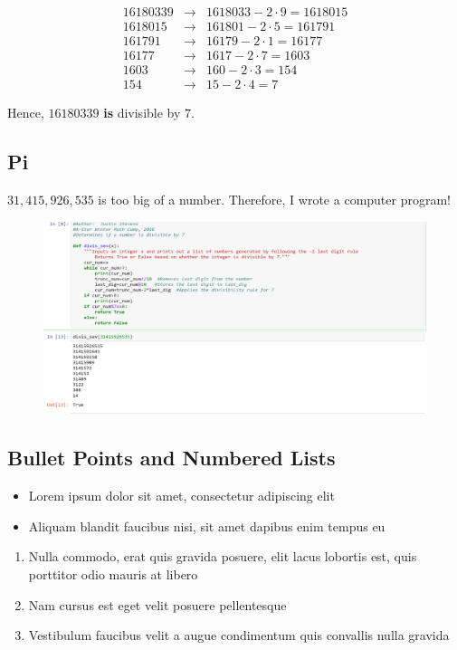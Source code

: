 \begin{eqnarray*}
	16180339 &\to& 1618033-2\cdot 9=1618015 \\ 1618015 &\to& 161801-2\cdot 5=161791 \\ 161791 &\to& 16179-2\cdot 1=16177 \\ 16177 &\to& 1617-2\cdot 7=1603 \\ 1603 &\to& 160-2\cdot 3=154 \\ 154 &\to& 15-2\cdot 4=7
\end{eqnarray*}  

Hence, $16180339$ \textbf{is} divisible by $7$.

\clearpage

\subsection*{Pi}

$31,415,926,535$ is too big of a number.  Therefore, I wrote a computer program!



\begin{figure}[h]
	\centering\includegraphics[width=1\linewidth]{images/seven.png}
\end{figure}
\clearpage


\subsection{Bullet Points and Numbered Lists}

\begin{itemize}
\item Lorem ipsum dolor sit amet, consectetur adipiscing elit
\item Aliquam blandit faucibus nisi, sit amet dapibus enim tempus eu
\end{itemize}

\begin{enumerate}
\item Nulla commodo, erat quis gravida posuere, elit lacus lobortis est, quis porttitor odio mauris at libero
\item Nam cursus est eget velit posuere pellentesque
\item Vestibulum faucibus velit a augue condimentum quis convallis nulla gravida
\end{enumerate}


